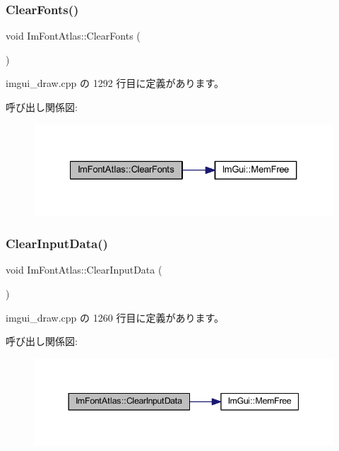 \subsubsection{\texorpdfstring{Clear\+Fonts()}{ClearFonts()}}
{\footnotesize\ttfamily void Im\+Font\+Atlas\+::\+Clear\+Fonts (\begin{DoxyParamCaption}{ }\end{DoxyParamCaption})}



 imgui\+\_\+draw.\+cpp の 1292 行目に定義があります。

呼び出し関係図\+:\nopagebreak
\begin{figure}[H]
\begin{center}
\leavevmode
\includegraphics[width=327pt]{struct_im_font_atlas_ad5c2560d708bd0c389e9bd9da2d9b055_cgraph}
\end{center}
\end{figure}
\mbox{\label{struct_im_font_atlas_a3f5bcbb7a2683b1af106fcf4e1217662}} 
\subsubsection{\texorpdfstring{Clear\+Input\+Data()}{ClearInputData()}}
{\footnotesize\ttfamily void Im\+Font\+Atlas\+::\+Clear\+Input\+Data (\begin{DoxyParamCaption}{ }\end{DoxyParamCaption})}



 imgui\+\_\+draw.\+cpp の 1260 行目に定義があります。

呼び出し関係図\+:\nopagebreak
\begin{figure}[H]
\begin{center}
\leavevmode
\includegraphics[width=344pt]{struct_im_font_atlas_a3f5bcbb7a2683b1af106fcf4e1217662_cgraph}
\end{center}
\end{figure}
\mbox{\label{struct_im_font_atlas_a3ede4bd513bec044c77ac392ad9c6e86}} 
